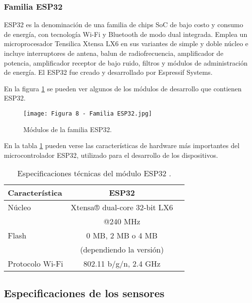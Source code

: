 \subsubsection{Familia ESP32 \citep{13}}

ESP32 es la denominación de una familia de chips SoC de bajo costo y consumo de energía, con tecnología Wi-Fi y Bluetooth de modo dual integrada. Emplea un microprocesador Tensilica Xtensa LX6 en sus variantes de simple y doble núcleo e incluye interruptores de antena, balun de radiofrecuencia, amplificador de potencia, amplificador receptor de bajo ruido, filtros y módulos de administración de energía. El ESP32 fue creado y desarrollado por Espressif Systems.

En la figura \ref{fig:8} se pueden ver algunos de los módulos de desarrollo que contienen ESP32.

\begin{figure}[h]
\centering
\texttt{[image: Figura 8 - Familia ESP32.jpg]}
\caption[Módulos de la familia ESP32]{Módulos de la familia ESP32. \footnotemark}
\label{fig:8}
\end{figure}

En la tabla \ref{tab:esp32} pueden verse las características de hardware más importantes del microcontrolador ESP32, utilizado para el desarrollo de los dispositivos.

\begin{table}[h]
\centering
\caption[Especificaciones técnicas del módulo ESP32]{Especificaciones técnicas del módulo ESP32 \citep{14}.}
\begin{tabular}{l c c}
\toprule
\textbf{Característica} & \textbf{ESP32}\\
\midrule
Núcleo			& Xtensa® dual-core 32-bit LX6\\
				& @240 MHz\\
Flash			& 0 MB, 2 MB o 4 MB\\
				& (dependiendo la versión)\\
Protocolo Wi-Fi	& 802.11 b/g/n, 2.4 GHz\\
\bottomrule
\hline
\end{tabular}
\label{tab:esp32}
\end{table}

\subsection{Especificaciones de los sensores}

